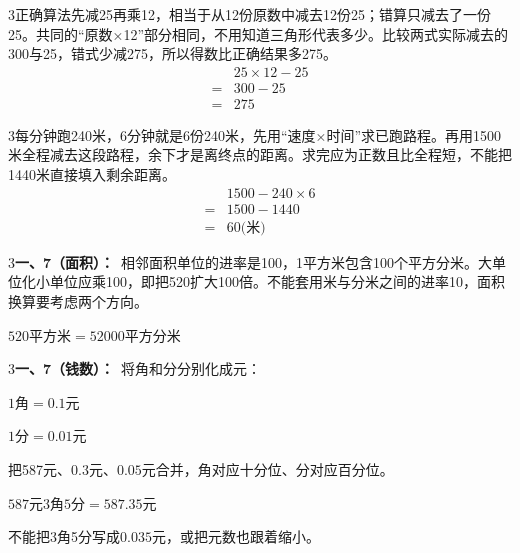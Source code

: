 \documentclass[multi=snippet,border={5bp 20bp 5bp 5bp}]{standalone}
\newenvironment{snippet}[3]{\begin{minipage}{#1bp}\color{answerred}\fontsize{#2}{#3}\selectfont\raggedright}{\end{minipage}}
\begin{document}
\begin{snippet}{505}{11.5}{14}\begin{multicols}{3}\raggedcolumns 正确算法先减25再乘12，相当于从12份原数中减去12份25；错算只减去了一份25。共同的“原数×12”部分相同，不用知道三角形代表多少。比较两式实际减去的300与25，错式少减275，所以得数比正确结果多275。\[\begin{aligned}&25\times12-25\\={}&300-25\\={}&275\end{aligned}\]\end{multicols}\end{snippet}
\begin{snippet}{505}{11.5}{14}\begin{multicols}{3}\raggedcolumns 每分钟跑240米，6分钟就是6份240米，先用“速度×时间”求已跑路程。再用1500米全程减去这段路程，余下才是离终点的距离。求完应为正数且比全程短，不能把1440米直接填入剩余距离。\[\begin{aligned}&1500-240\times6\\={}&1500-1440\\={}&60\text{(米)}\end{aligned}\]\end{multicols}\end{snippet}
\begin{snippet}{505}{11.5}{14}\begin{multicols}{3}\raggedcolumns \textbf{一、7（面积）：}\ 相邻面积单位的进率是100，1平方米包含100个平方分米。大单位化小单位应乘100，即把520扩大100倍。不能套用米与分米之间的进率10，面积换算要考虑两个方向。\par\noindent\(\displaystyle 520\text{平方米}=52000\text{平方分米}\)\allowbreak \par\end{multicols}\end{snippet}
\begin{snippet}{505}{11.5}{14}\begin{multicols}{3}\raggedcolumns \textbf{一、7（钱数）：}\ 将角和分分别化成元：\par\noindent\(\displaystyle 1\text{角}=0.1\text{元}\)\allowbreak \par \noindent\(\displaystyle 1\text{分}=0.01\text{元}\)\allowbreak \par 把587元、\(0.3\)\allowbreak 元、\(0.05\)\allowbreak 元合并，角对应十分位、分对应百分位。\par\noindent\(\displaystyle 587\text{元}3\text{角}5\text{分}=587.35\text{元}\)\allowbreak \par 不能把3角5分写成\(0.035\)\allowbreak 元，或把元数也跟着缩小。\end{multicols}\end{snippet}
\end{document}
